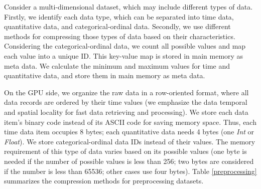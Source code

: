   

Consider a multi-dimensional dataset, which may include different types of data.  Firstly, we identify each data type, which can be separated into time data, quantitative data, and categorical-ordinal data. Secondly, we use different methods for compressing those types of data based on their characteristics.    
Considering the categorical-ordinal data, we count  all possible values and map each value into a unique ID. This  key-value map is stored in main memory as meta data.  We calculate the minimum and maximum values for time and quantitative data, and store them in main memory as  meta data.    
 
On the GPU side, we organize the raw data in a row-oriented format, where all data records are ordered by their time values (we emphasize the data temporal and spatial locality for fast data retrieving and processing). We store each data item's binary code instead of its ASCII code for saving memory space. Thus, each time data item occupies 8 bytes; each quantitative data needs 4 bytes (one \textit{Int} or \textit{Float}). We store categorical-ordinal data IDs instead of their values. The memory requirement of this type of data varies based on its possible values (one byte is needed if the number of possible values is less than 256; two bytes are considered if the number is less than 65536; other cases use four bytes). Table \ref{preprocessing} summarizes the compression methods for preprocessing datasets. %


